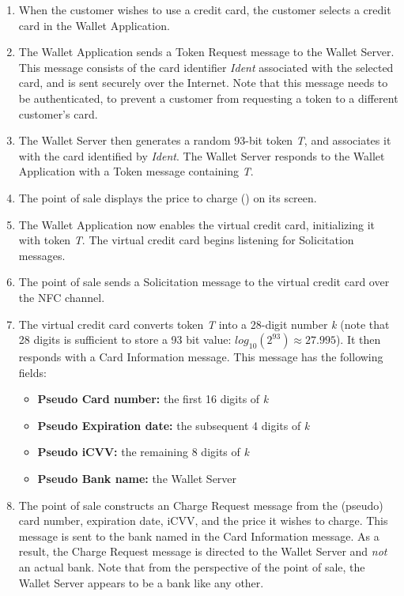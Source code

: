 \begin{enumerate}

\item When the customer wishes to use a credit card, the customer selects a credit card in the Wallet Application.

\item The Wallet Application sends a Token Request message to the Wallet Server.
    This message consists of the card identifier \emph{Ident} associated with the selected card, and is sent securely over the Internet.
    Note that this message needs to be authenticated, to prevent a customer from requesting a token to a different customer's card.

\item The Wallet Server then generates a random 93-bit token \emph{T}, and associates it with the card identified by \emph{Ident}.
    The Wallet Server responds to the Wallet Application with a Token message containing \emph{T}.

\item The point of sale displays the price to charge (\val{\$}) on its screen.

\item The Wallet Application now enables the virtual credit card, initializing it with token \emph{T}.
    The virtual credit card begins listening for Solicitation messages.

\item The point of sale sends a Solicitation message to the virtual credit card over the NFC channel.

\item The virtual credit card converts token \emph{T} into a 28-digit number \emph{k}
    (note that 28 digits is sufficient to store a 93 bit value: $log_{10}(2^{93}) \approx 27.995$).
    It then responds with a Card Information message.
    This message has the following fields:
    \begin{itemize}
    \item \textbf{Pseudo Card number:} the first 16 digits of \emph{k}
    \item \textbf{Pseudo Expiration date:} the subsequent 4 digits of \emph{k}
    \item \textbf{Pseudo iCVV:} the remaining 8 digits of \emph{k}
    \item \textbf{Pseudo Bank name:} the Wallet Server
   	\end{itemize}

\item The point of sale constructs an Charge Request message from the (pseudo) card number, expiration date, iCVV, and the price it wishes to charge.
    This message is sent to the bank named in the Card Information message.
    As a result, the Charge Request message is directed to the Wallet Server and \emph{not} an actual bank.
    Note that from the perspective of the point of sale, the Wallet Server appears to be a bank like any other.


\end{enumerate}
